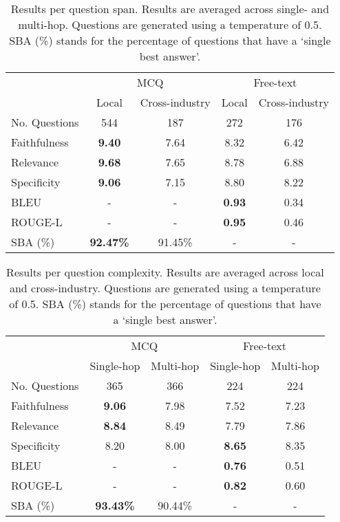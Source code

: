 \begin{table}[H]
\centering
\begin{tabular}{lcccc}
\hline
              & \multicolumn{2}{c}{MCQ}  & \multicolumn{2}{c}{Free-text} \\ \cline{2-5} 
              & Local   & Cross-industry & Local     & Cross-industry    \\ \cline{2-5} 
No. Questions & 544     & 187            & 272       & 176               \\
Faithfulness  & \textbf{9.40}    & 7.64           & 8.32      & 6.42              \\
Relevance     & \textbf{9.68}    & 7.65           & 8.78      & 6.88              \\
Specificity   & \textbf{9.06}    & 7.15           & 8.80      & 8.22              \\
BLEU          & -       & -              & \textbf{0.93}      & 0.34              \\
ROUGE-L       & -       & -              & \textbf{0.95}      & 0.46              \\
SBA (\%)      & \textbf{92.47\%} & 91.45\%        & -         & -                 \\ \hline
\end{tabular}
\caption{Results per question span. Results are averaged across single- and multi-hop. Questions are generated using a temperature of 0.5. SBA (\%) stands for the percentage of questions that have a `single best answer'.}
\label{tab:perindustry_results}
\end{table}

\begin{table}[H]
\centering
\begin{tabular}{lcccc}
\hline
              & \multicolumn{2}{c}{MCQ} & \multicolumn{2}{c}{Free-text} \\ \cline{2-5} 
              & Single-hop  & Multi-hop & Single-hop     & Multi-hop    \\ \cline{2-5} 
No. Questions & 365         & 366       & 224            & 224          \\
Faithfulness  & \textbf{9.06}        & 7.98      & 7.52           & 7.23         \\
Relevance     & \textbf{8.84}        & 8.49      & 7.79           & 7.86         \\
Specificity   & 8.20         & 8.00         & \textbf{8.65}           & 8.35         \\
BLEU          & -           & -         & \textbf{0.76}           & 0.51         \\
ROUGE-L       & -           & -         & \textbf{0.82}           & 0.60          \\
SBA (\%)      & \textbf{93.43\%}     & 90.44\%   & -              & -            \\ \hline
\end{tabular}
\caption{Results per question complexity. Results are averaged across local and cross-industry. Questions are generated using a temperature of 0.5. SBA (\%) stands for the percentage of questions that have a `single best answer'.}
\label{tab:per_hop}
\end{table}

